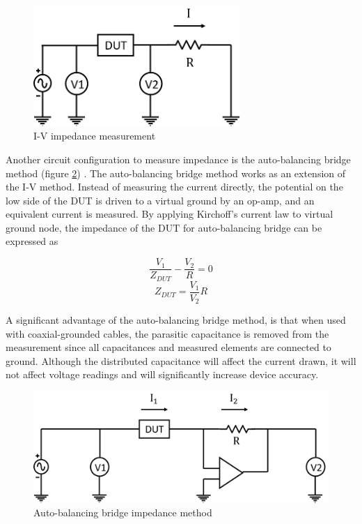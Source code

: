  \begin{figure}[ht]
    \centering
    \includegraphics[width=0.7\textwidth]{images/I-VMethod.png}
    \caption[I-V impedance measurement configuration]{I-V impedance measurement }
    \label{fig:IV_impedance_measurement}
\end{figure}

\par Another circuit configuration to measure impedance is the auto-balancing bridge method (figure \ref{fig:auto-balancing_bridge}) \cite{keysight_technologies_impedance_2015}. The auto-balancing bridge method works as an extension of the I-V method. Instead of measuring the current directly, the potential on the low side of the DUT is driven to a virtual ground by an op-amp, and an equivalent current is measured. By applying Kirchoff's current law to virtual ground node, the impedance of the DUT for auto-balancing bridge can be expressed as

\begin{equation}
    \frac{V_1}{Z_{DUT}} - \frac{V_2}{R} = 0
\end{equation}
\begin{equation}
    Z_{DUT} = \frac{V_1}{V_2}R
\end{equation}

A significant advantage of the auto-balancing bridge method, is that when used with coaxial-grounded cables, the parasitic capacitance is removed from the measurement since all capacitances and measured elements are connected to ground. Although the distributed capacitance will affect the current drawn, it will not affect voltage readings and will significantly increase device accuracy.

 \begin{figure}[ht]
    \centering
    \includegraphics[width=\textwidth]{images/autoBalancingBridge.png}
    \caption[Auto-balancing bridge impedance method]{Auto-balancing bridge impedance method}
    \label{fig:auto-balancing_bridge}
\end{figure}
 
